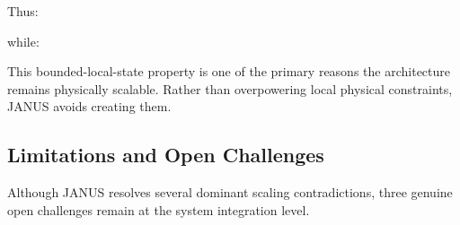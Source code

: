 \documentclass[journal]{IEEEtran}
\begin{document}
Thus:
\begin{center}
\end{center}

while:
\begin{center}
\end{center}

This bounded-local-state property is one of the primary reasons the architecture remains physically scalable. Rather than overpowering local physical constraints, JANUS avoids creating them.

\subsection{\textbf{Limitations and Open Challenges}}

Although JANUS resolves several dominant scaling contradictions, three genuine open challenges remain at the system integration level.
\end{document}
